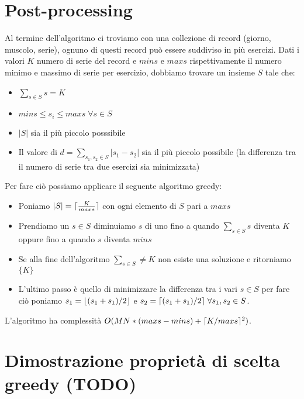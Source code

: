 \documentclass{article}
\DeclarePairedDelimiter\ceil{\lceil}{\rceil}
\DeclarePairedDelimiter\floor{\lfloor}{\rfloor}
\begin{document}
\section{Post-processing}
Al termine dell'algoritmo ci troviamo con una collezione di record (giorno,
muscolo, serie), ognuno di questi record può essere suddiviso in più
esercizi. Dati i valori $K$ numero di serie del record e $mins$ e $maxs$
rispettivamente il numero minimo e massimo di serie per esercizio, dobbiamo
trovare un insieme $S$ tale che:
\begin{itemize}
    \item $\sum_{s \in S} s = K$
    \item $mins \leq s_i \leq maxs \; \forall s \in S$
    \item $|S|$ sia il più piccolo posssibile
    \item Il valore di $d = \sum_{s_1, s_2 \in S} |s_1 - s_2|$ sia il più piccolo
          possibile (la differenza tra il numero di serie tra due esercizi sia
          minimizzata)
\end{itemize}
Per fare ciò possiamo applicare il seguente algoritmo greedy:
\begin{itemize}
    \item Poniamo $|S| = \ceil{\frac{K}{maxs}}$ con ogni elemento di $S$
          pari a $maxs$
    \item Prendiamo un $s \in S$ diminuiamo $s$ di uno fino a quando
          $\sum_{s \in S} s$ diventa $K$ oppure fino a quando $s$ diventa $mins$
    \item Se alla fine dell'algoritmo $\sum_{s \in S} \neq K$ non esiste una
          soluzione e ritorniamo $\{ K \}$
    \item L'ultimo passo è quello di minimizzare la differenza tra i vari
          $s \in S$ per fare ciò poniamo $s_1 = \floor{(s_1 + s_1) / 2}$
          e $s_2 = \ceil{(s_1 + s_1) / 2} \; \forall s_1, s_2 \in S$.
\end{itemize}
L'algoritmo ha complessità $O(MN * (maxs - mins) + \ceil{K / maxs}^2)$.
\section{Dimostrazione proprietà di scelta greedy (TODO)}
\end{document}
